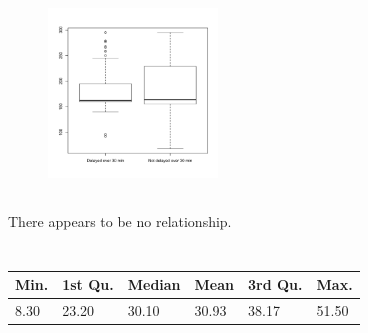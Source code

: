 \documentclass[twocolumn]{article}
\newcommand{\setsection}[1]{\setcounter{section}{#1}\addtocounter{section}{-1}\section{}}
\begin{document}
\subsection{}
\vspace{-7pt}
\begin{figure}[!ht]
\centering
\includegraphics[width=0.4\textwidth]{4c.pdf}
\end{figure}


\subsection{}
There appears to be no relationship.

\setsection{6}

\subsection{}
\vspace{-1em}
\begin{table}[h]
\centering
\begin{tabular}{@{}llllll@{}}
\toprule
Min. & 1st Qu. & Median & Mean  & 3rd Qu. & Max.  \\ \midrule
8.30 & 23.20   & 30.10  & 30.93 & 38.17   & 51.50  \\ \bottomrule
\end{tabular}
\end{table}
\end{document}
